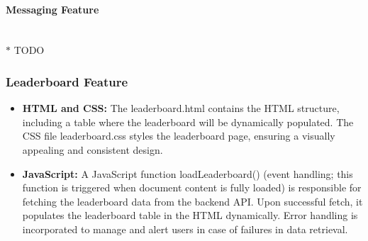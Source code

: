 \documentclass[12pt]{article}
\begin{document}
\paragraph{Messaging Feature}
\\ $\ast$ TODO

\subsubsection{Leaderboard Feature}
\begin{itemize}
    \item \textbf{HTML and CSS:} The leaderboard.html contains the HTML structure, including a table where the leaderboard will be dynamically populated. The CSS file leaderboard.css styles the leaderboard page, ensuring a visually appealing and consistent design.
    \item \textbf{JavaScript:} A JavaScript function loadLeaderboard() (event handling; this function is triggered when document content is fully loaded) is responsible for fetching the leaderboard data from the backend API. Upon successful fetch, it populates the leaderboard table in the HTML dynamically. Error handling is incorporated to manage and alert users in case of failures in data retrieval.
\end{itemize}
\end{document}
